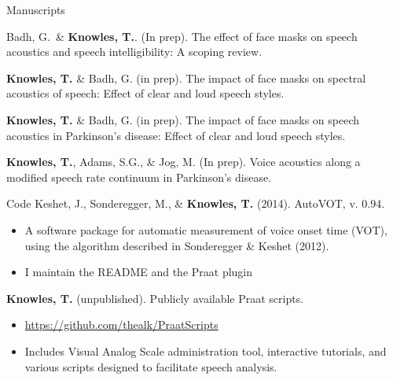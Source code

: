 \documentclass{resume} %
\begin{document}
\begin{rSection}{Manuscripts}
	
Badh, G.\dagger\ \& {\bf Knowles, T.}. (In prep). The effect of face masks on speech acoustics and speech intelligibility: A scoping review.

{\bf Knowles, T.} \& Badh, G. (in prep). The impact of face masks on spectral acoustics of speech: Effect of clear and loud speech styles.

{\bf Knowles, T.} \& Badh, G. (in prep). The impact of face masks on speech acoustics in Parkinson's disease: Effect of clear and loud speech styles.

{\bf Knowles, T.}, Adams, S.G., \& Jog, M. (In prep). Voice acoustics along a modified speech rate continuum in Parkinson's disease.


\end{rSection}



\begin{rSection}{Code}
	Keshet, J., Sonderegger, M., \& {\bf Knowles, T.} (2014). AutoVOT, v. 0.94.
	\begin{itemize}
			\renewcommand\labelitemi{$\cdot$}
		\item A software package for automatic measurement of voice onset time (VOT), using the algorithm described in Sonderegger \& Keshet (2012).
		\item I maintain the README and the Praat plugin
	\end{itemize}
	
	{\bf Knowles, T.} (unpublished). Publicly available Praat scripts.
	\begin{itemize}
			\renewcommand\labelitemi{$\cdot$}
		\item \url{https://github.com/thealk/PraatScripts}
		\item Includes Visual Analog Scale administration tool, interactive tutorials, and various scripts designed to facilitate speech analysis.
	\end{itemize}
\end{rSection}


\end{document}
